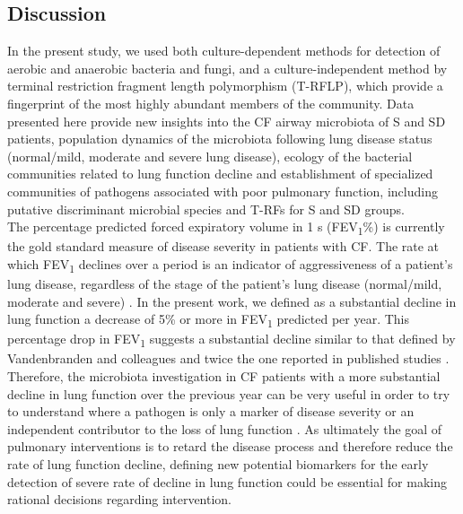 \subsection{Discussion}
In the present study, we used both culture-dependent methods for detection of aerobic and anaerobic bacteria and fungi, and a culture-independent method by terminal restriction fragment length polymorphism (T-RFLP), which provide a fingerprint of the most highly abundant members of the community. Data presented here provide new insights into the CF airway microbiota of S and SD patients, population dynamics of the microbiota following lung disease status (normal/mild, moderate and severe lung disease), ecology of the bacterial communities related to lung function decline and establishment of specialized communities of pathogens associated with poor pulmonary function, including putative discriminant microbial species and T-RFs for S and SD groups.\\
The percentage predicted forced expiratory volume in 1 s (FEV\textsubscript{1}\%) is currently the gold standard measure of disease severity in patients with CF. The rate at which FEV\textsubscript{1} declines over a period is an indicator of aggressiveness of a patient's lung disease, regardless of the stage of the patient's lung disease (normal/mild, moderate and severe) \cite{zhao2012decade}. In the present work, we defined as a substantial decline in lung function a decrease of 5\% or more in FEV\textsubscript{1} predicted per year. This percentage drop in FEV\textsubscript{1} suggests a substantial decline similar to that defined by Vandenbranden and colleagues \cite{vandenbranden2012lung} and twice the one reported in published studies \cite{sanders2010failure}. Therefore, the microbiota investigation in CF patients with a more substantial decline in lung function over the previous year can be very useful in order to try to understand where a pathogen is only a marker of disease severity or an independent contributor to the loss of lung function \cite{milla1998risk}.  As ultimately the goal of pulmonary interventions is to retard the disease process and therefore reduce the rate of lung function decline, defining new potential biomarkers for the early detection of severe rate of decline in lung function could be essential for making rational decisions regarding intervention.\\
